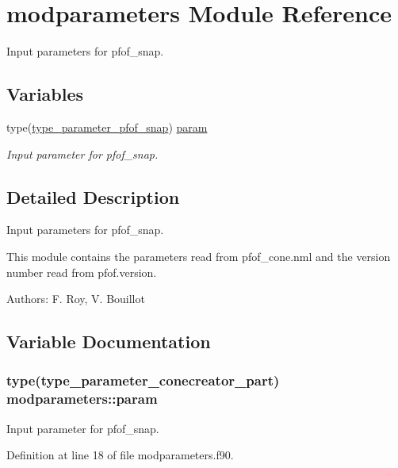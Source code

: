 \hypertarget{namespacemodparameters}{}\section{modparameters Module Reference}
\label{namespacemodparameters}


Input parameters for pfof\+\_\+snap. ~\newline
  


\subsection*{Variables}
\begin{DoxyCompactItemize}
\item 
type(\hyperlink{structmodconstant_1_1type__parameter__pfof__snap}{type\+\_\+parameter\+\_\+pfof\+\_\+snap}) \hyperlink{namespacemodparameters_abc02ba22055134e4f7e714d0cc521f61}{param}
\begin{DoxyCompactList}\small\item\em Input parameter for pfof\+\_\+snap. \end{DoxyCompactList}\end{DoxyCompactItemize}


\subsection{Detailed Description}
Input parameters for pfof\+\_\+snap. ~\newline
 

This module contains the parameters read from pfof\+\_\+cone.\+nml and the version number read from pfof.\+version.

Authors\+: F. Roy, V. Bouillot 

\subsection{Variable Documentation}
\subsubsection[{\texorpdfstring{param}{param}}]{\setlength{\rightskip}{0pt plus 5cm}type({\bf type\+\_\+parameter\+\_\+conecreator\+\_\+part}) modparameters\+::param}\hypertarget{namespacemodparameters_abc02ba22055134e4f7e714d0cc521f61}{}\label{namespacemodparameters_abc02ba22055134e4f7e714d0cc521f61}


Input parameter for pfof\+\_\+snap. 



Definition at line 18 of file modparameters.\+f90.

